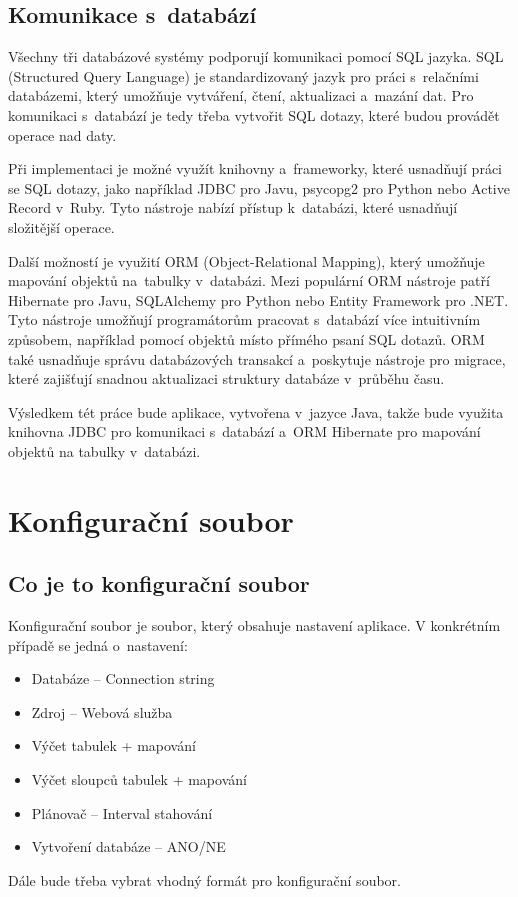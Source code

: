 \documentclass[czech, kiv, ba, he, iso690alph, pdf]{fasthesis}
\begin{document}
\pagebreak
\section{Komunikace s~databází}
Všechny tři databázové systémy podporují komunikaci pomocí SQL jazyka.
SQL (Structured Query Language) je standardizovaný jazyk pro práci s~relačními databázemi,
který umožňuje vytváření, čtení, aktualizaci a~mazání dat.
Pro komunikaci s~databází je tedy třeba vytvořit SQL dotazy, které budou provádět operace nad daty.

Při implementaci je možné využít knihovny a~frameworky, které usnadňují práci se SQL dotazy, 
jako například JDBC pro Javu, psycopg2 pro Python nebo Active Record v~Ruby. 
Tyto nástroje nabízí přístup k~databázi, které usnadňují složitější operace.

Další možností je využití ORM (Object-Relational Mapping), který umožňuje mapování objektů na~tabulky v~databázi.
Mezi populární ORM nástroje patří Hibernate pro Javu, SQLAlchemy pro Python nebo Entity Framework pro .NET. 
Tyto nástroje umožňují programátorům pracovat s~databází více intuitivním způsobem, například pomocí objektů 
místo přímého psaní SQL dotazů. ORM také usnadňuje správu databázových transakcí a~poskytuje nástroje pro migrace, 
které zajišťují snadnou aktualizaci struktury databáze v~průběhu času.

Výsledkem tét práce bude aplikace, vytvořena v~jazyce Java, takže bude využita knihovna JDBC pro komunikaci 
s~databází a~ORM Hibernate pro mapování objektů na tabulky v~databázi.

\chapter{Konfigurační soubor}
\section{Co je to konfigurační soubor}
Konfigurační soubor je soubor, který obsahuje nastavení aplikace.
V konkrétním případě se jedná o~nastavení:
\begin{itemize}
    \item Databáze -- Connection string
    \item Zdroj -- Webová služba
    \item Výčet tabulek + mapování
    \item Výčet sloupců tabulek + mapování
    \item Plánovač -- Interval stahování
    \item Vytvoření databáze -- ANO/NE
\end{itemize}
Dále bude třeba vybrat vhodný formát pro konfigurační soubor.
\end{document}
